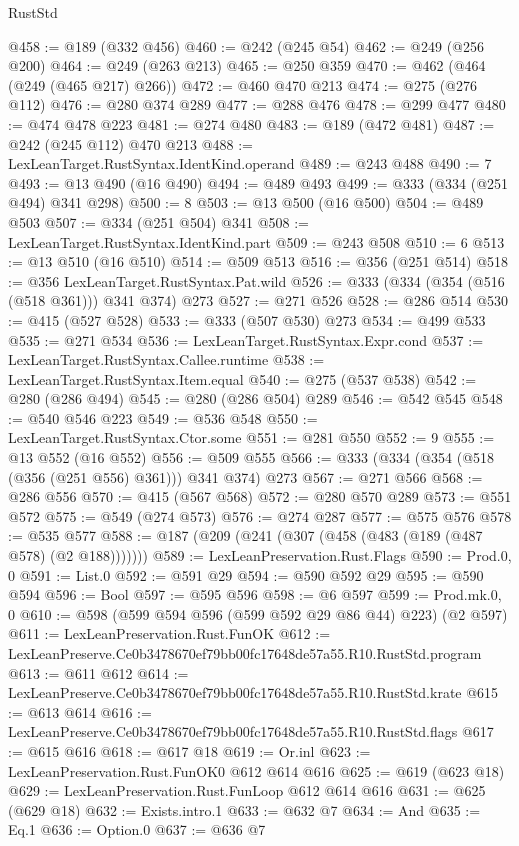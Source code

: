 \begin{lexlean}{RustStd}
\begin{coremodule}
@458 := @189 (@332 @456)
@460 := @242 (@245 @54)
@462 := @249 (@256 @200)
@464 := @249 (@263 @213)
@465 := @250 @359
@470 := @462 (@464 (@249 (@465 @217) @266))
@472 := @460 @470 @213
@474 := @275 (@276 @112)
@476 := @280 @374 @289
@477 := @288 @476
@478 := @299 @477
@480 := @474 @478 @223
@481 := @274 @480
@483 := @189 (@472 @481)
@487 := @242 (@245 @112) @470 @213
@488 := LexLeanTarget.RustSyntax.IdentKind.operand
@489 := @243 @488
@490 := 7
@493 := @13 @490 (@16 @490)
@494 := @489 @493
@499 := @333 (@334 (@251 @494) @341 @298)
@500 := 8
@503 := @13 @500 (@16 @500)
@504 := @489 @503
@507 := @334 (@251 @504) @341
@508 := LexLeanTarget.RustSyntax.IdentKind.part
@509 := @243 @508
@510 := 6
@513 := @13 @510 (@16 @510)
@514 := @509 @513
@516 := @356 (@251 @514)
@518 := @356 LexLeanTarget.RustSyntax.Pat.wild
@526 := @333 (@334 (@354 (@516 (@518 @361))) @341 @374) @273
@527 := @271 @526
@528 := @286 @514
@530 := @415 (@527 @528)
@533 := @333 (@507 @530) @273
@534 := @499 @533
@535 := @271 @534
@536 := LexLeanTarget.RustSyntax.Expr.cond
@537 := LexLeanTarget.RustSyntax.Callee.runtime
@538 := LexLeanTarget.RustSyntax.Item.equal
@540 := @275 (@537 @538)
@542 := @280 (@286 @494)
@545 := @280 (@286 @504) @289
@546 := @542 @545
@548 := @540 @546 @223
@549 := @536 @548
@550 := LexLeanTarget.RustSyntax.Ctor.some
@551 := @281 @550
@552 := 9
@555 := @13 @552 (@16 @552)
@556 := @509 @555
@566 := @333 (@334 (@354 (@518 (@356 (@251 @556) @361))) @341 @374) @273
@567 := @271 @566
@568 := @286 @556
@570 := @415 (@567 @568)
@572 := @280 @570 @289
@573 := @551 @572
@575 := @549 (@274 @573)
@576 := @274 @287
@577 := @575 @576
@578 := @535 @577
@588 := @187 (@209 (@241 (@307 (@458 (@483 (@189 (@487 @578) (@2 @188)))))))
@589 := LexLeanPreservation.Rust.Flags
@590 := Prod.{0, 0}
@591 := List.{0}
@592 := @591 @29
@594 := @590 @592 @29
@595 := @590 @594
@596 := Bool
@597 := @595 @596
@598 := @6 @597
@599 := Prod.mk.{0, 0}
@610 := @598 (@599 @594 @596 (@599 @592 @29 @86 @44) @223) (@2 @597)
@611 := LexLeanPreservation.Rust.FunOK
@612 := LexLeanPreserve.Ce0b3478670ef79bb00fc17648de57a55.R10.RustStd.program
@613 := @611 @612
@614 := LexLeanPreserve.Ce0b3478670ef79bb00fc17648de57a55.R10.RustStd.krate
@615 := @613 @614
@616 := LexLeanPreserve.Ce0b3478670ef79bb00fc17648de57a55.R10.RustStd.flags
@617 := @615 @616
@618 := @617 @18
@619 := Or.inl
@623 := LexLeanPreservation.Rust.FunOK0 @612 @614 @616
@625 := @619 (@623 @18)
@629 := LexLeanPreservation.Rust.FunLoop @612 @614 @616
@631 := @625 (@629 @18)
@632 := Exists.intro.{1}
@633 := @632 @7
@634 := And
@635 := Eq.{1}
@636 := Option.{0}
@637 := @636 @7

\end{coremodule}
\end{lexlean}

